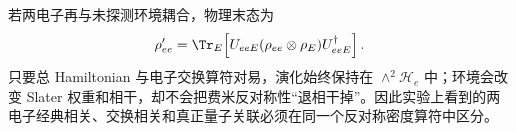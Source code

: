 若两电子再与未探测环境耦合，物理末态为
\[
\rho_{ee}'
=\Tr_E\!\left[
U_{eeE}(\rho_{ee}\otimes\rho_E)U_{eeE}^\dagger
\right].
\]
只要总 Hamiltonian 与电子交换算符对易，演化始终保持在 $\wedge^2\mathcal H_e$ 中；环境会改变 Slater 权重和相干，却不会把费米反对称性“退相干掉”。因此实验上看到的两电子经典相关、交换相关和真正量子关联必须在同一个反对称密度算符中区分。


